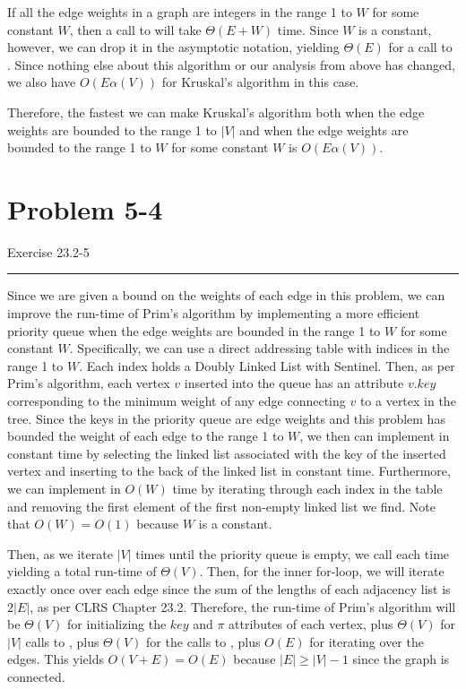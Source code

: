 \documentclass[11pt]{article}
\def\separateline{\medskip\hrule\medskip}
\begin{document}
If all the edge weights in a graph are integers in the range 1 to $W$ for some constant $W$, then a call to  will take $\Theta(E + W)$ time. Since $W$ is a constant, however, we can drop it in the asymptotic notation, yielding $\Theta(E)$ for a call to . Since nothing else about this algorithm or our analysis from above has changed, we also have $O(E\alpha(V))$ for Kruskal's algorithm in this case.

Therefore, the fastest we can make Kruskal's algorithm both when the edge weights are bounded to the range 1 to $|V|$ and when the edge weights are bounded to the range 1 to $W$ for some constant $W$ is $O(E\alpha(V))$.

\newpage

\section{Problem 5-4}
Exercise 23.2-5
\separateline

Since we are given a bound on the weights of each edge in this problem, we can improve the run-time of Prim's algorithm by implementing a more efficient priority queue when the edge weights are bounded in the range 1 to $W$ for some constant $W$. Specifically, we can use a direct addressing table with indices in the range 1 to $W$. Each index holds a Doubly Linked List with Sentinel. Then, as per Prim's algorithm, each vertex $v$ inserted into the queue has an attribute $v.key$ corresponding to the minimum weight of any edge connecting $v$ to a vertex in the tree. Since the keys in the priority queue are edge weights and this problem has bounded the weight of each edge to the range 1 to $W$, we then can implement  in constant time by selecting the linked list associated with the key of the inserted vertex and inserting to the back of the linked list in constant time. Furthermore, we can implement  in $O(W)$ time by iterating through each index in the table and removing the first element of the first non-empty linked list we find. Note that $O(W) = O(1)$ because $W$ is a constant.

Then, as we iterate $|V|$ times until the priority queue is empty, we call  each time yielding a total run-time of $\Theta(V)$. Then, for the inner for-loop, we will iterate exactly once over each edge since the sum of the lengths of each adjacency list is $2|E|$, as per CLRS Chapter 23.2. Therefore, the run-time of Prim's algorithm will be $\Theta(V)$ for initializing the $key$ and $\pi$ attributes of each vertex, plus $\Theta(V)$ for $|V|$ calls to , plus $\Theta(V)$ for the calls to , plus $O(E)$ for iterating over the edges. This yields $O(V + E) = O(E)$ because $|E| \geq |V| - 1$ since the graph is connected.
\end{document}
